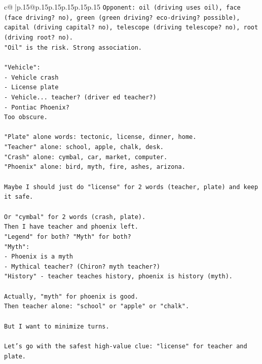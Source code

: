 \documentclass{article}
\begin{document}
{\begin{supertabular}{c@{$\;$}|p{.15\linewidth}@{}p{.15\linewidth}p{.15\linewidth}p{.15\linewidth}p{.15\linewidth}p{.15\linewidth}}
{{{\texttt{Opponent: oil (driving uses oil), face (face driving? no), green (green driving? eco{-}driving? possible), capital (driving capital? no), telescope (driving telescope? no), root (driving root? no).} \\
\texttt{"Oil" is the risk. Strong association.} \\
\\ 
\texttt{"Vehicle":} \\
\texttt{{-} Vehicle crash} \\
\texttt{{-} License plate} \\
\texttt{{-} Vehicle... teacher? (driver ed teacher?)} \\
\texttt{{-} Pontiac Phoenix?} \\
\texttt{Too obscure.} \\
\\ 
\texttt{"Plate" alone words: tectonic, license, dinner, home.} \\
\texttt{"Teacher" alone: school, apple, chalk, desk.} \\
\texttt{"Crash" alone: cymbal, car, market, computer.} \\
\texttt{"Phoenix" alone: bird, myth, fire, ashes, arizona.} \\
\\ 
\texttt{Maybe I should just do "license" for 2 words (teacher, plate) and keep it safe.} \\
\\ 
\texttt{Or "cymbal" for 2 words (crash, plate).} \\
\texttt{Then I have teacher and phoenix left.} \\
\texttt{"Legend" for both? "Myth" for both?} \\
\texttt{"Myth":} \\
\texttt{{-} Phoenix is a myth} \\
\texttt{{-} Mythical teacher? (Chiron? myth teacher?)} \\
\texttt{"History" {-} teacher teaches history, phoenix is history (myth).} \\
\\ 
\texttt{Actually, "myth" for phoenix is good.} \\
\texttt{Then teacher alone: "school" or "apple" or "chalk".} \\
\\ 
\texttt{But I want to minimize turns.} \\
\\ 
\texttt{Let's go with the safest high{-}value clue: "license" for teacher and plate.} \\
}}}
\end{supertabular}}
\end{document}
